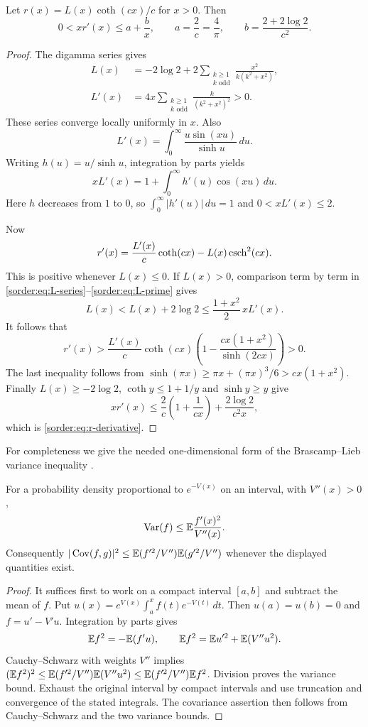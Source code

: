 \begin{lemma}\label{sorder:lem:r}
Let $r(x)=L(x)\coth(cx)/c$ for $x>0$. Then
\begin{equation}\label{sorder:eq:r-derivative}
 0<xr'(x)\le a+\frac b x,\qquad
 a=\frac2c=\frac4\pi,\qquad
 b=\frac{2+2\log2}{c^2}.
\end{equation}
\end{lemma}
\begin{proof}
The digamma series gives
\begin{align}
 L(x)&=-2\log2+2\sum_{\substack{k\ge1\\k\text{ odd}}}
          \frac{x^2}{k(k^2+x^2)},\label{sorder:eq:L-series}\\
 L'(x)&=4x\sum_{\substack{k\ge1\\k\text{ odd}}}
          \frac{k}{(k^2+x^2)^2}>0.\label{sorder:eq:L-prime}
\end{align}
These series converge locally uniformly in $x$. Also
\[
 L'(x)=\int_0^\infty\frac{u\sin(xu)}{\sinh u}\,du.
\]
Writing $h(u)=u/\sinh u$, integration by parts yields
\[
 xL'(x)=1+\int_0^\infty h'(u)\cos(xu)\,du.
\]
Here $h$ decreases from $1$ to $0$, so
$\int_0^\infty|h'(u)|\,du=1$ and $0<xL'(x)\le2$.

Now
\[
 r'(x)=\frac{L'(x)}c\coth(cx)-L(x)\operatorname{csch}^2(cx).
\]
This is positive whenever $L(x)\le0$. If $L(x)>0$, comparison term
by term in \eqref{sorder:eq:L-series}--\eqref{sorder:eq:L-prime}
gives
\[
 L(x)<L(x)+2\log2\le\frac{1+x^2}{2}\,xL'(x).
\]
It follows that
\[
 r'(x)>\frac{L'(x)}c\coth(cx)
 \left(1-\frac{cx(1+x^2)}{\sinh(2cx)}\right)>0.
\]
The last inequality follows from
$\sinh(\pi x)\ge\pi x+(\pi x)^3/6>cx(1+x^2)$.
Finally $L(x)\ge-2\log2$, $\coth y\le1+1/y$ and $\sinh y\ge y$
give
\[
 xr'(x)\le\frac2c\left(1+\frac1{cx}\right)
       +\frac{2\log2}{c^2x},
\]
which is \eqref{sorder:eq:r-derivative}.
\end{proof}

For completeness we give the needed one-dimensional form of the
Brascamp--Lieb variance inequality \cite{BL}.
\begin{lemma}\label{sorder:lem:BL}
For a probability density proportional to $e^{-V(x)}$ on an interval,
with $V''(x)>0$,
\[
 \operatorname{Var}(f)\le\mathbb E\frac{f'(x)^2}{V''(x)}.
\]
Consequently
$|\operatorname{Cov}(f,g)|^2\le
\mathbb E(f'^2/V'')\mathbb E(g'^2/V'')$ whenever the displayed quantities exist.
\end{lemma}
\begin{proof}
It suffices first to work on a compact interval $[a,b]$ and subtract
the mean of $f$. Put
$u(x)=e^{V(x)}\int_a^x f(t)e^{-V(t)}\,dt$.
Then $u(a)=u(b)=0$ and $f=u'-V'u$. Integration by parts gives
\[
 \mathbb E f^2=-\mathbb E(f'u),\qquad
 \mathbb E f^2=\mathbb E u'^2+\mathbb E(V''u^2).
\]
Cauchy--Schwarz with weights $V''$ implies
$(\mathbb E f^2)^2\le\mathbb E(f'^2/V'')\mathbb E(V''u^2)
\le\mathbb E(f'^2/V'')\mathbb E f^2$. Division proves the variance bound.
Exhaust the original interval by compact intervals and use truncation
and convergence of the stated integrals. The covariance assertion
then follows from Cauchy--Schwarz and the two variance bounds.
\end{proof}

